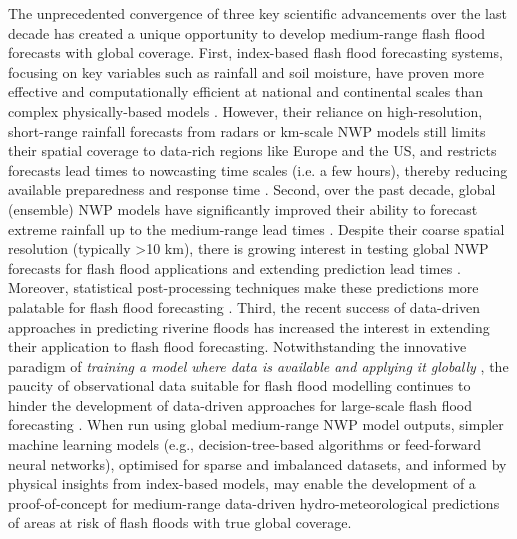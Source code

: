 The  unprecedented convergence of three key scientific advancements over the last decade has created a unique opportunity to develop medium-range flash flood forecasts with global coverage. First, index-based flash flood forecasting systems, focusing on key variables such as rainfall and soil moisture, have proven more effective and computationally efficient at national and continental scales than complex physically-based models \citep{Alfieri_2015a}. However, their reliance on high-resolution, short-range rainfall forecasts from radars or km-scale NWP models still limits their spatial coverage to data-rich regions like Europe and the US, and restricts forecasts lead times to nowcasting time scales (i.e. a few hours), thereby reducing available preparedness and response time \citep{Luong_2021, Maybee_2024}. Second, over the past decade, global (ensemble) NWP models have significantly improved their ability to forecast extreme rainfall up to the medium-range lead times \citep{Lavers_2021, Haiden_2023}. Despite their coarse spatial resolution (typically >10 km), there is growing interest in testing global NWP forecasts for flash flood applications and extending prediction lead times \citep{Bucherie_2022b}. Moreover, statistical post-processing techniques make these predictions more palatable for flash flood forecasting \citep{Vannitsem_2021}. Third, the recent success of data-driven approaches in predicting riverine floods \citep{Nearing_2024} has increased the interest in extending their application to flash flood forecasting. Notwithstanding the innovative paradigm of \textit{training a model where data is available and applying it globally} \citep{Kratzert_2024}, the paucity of observational data suitable for flash flood modelling continues to hinder the development of data-driven approaches for large-scale flash flood forecasting \citep{Alzubaidi_2023}. When run using global medium-range NWP model outputs, simpler machine learning models (e.g., decision-tree-based algorithms or feed-forward neural networks), optimised for sparse and imbalanced datasets, and informed by physical insights from index-based models, may enable the development of a proof-of-concept for medium-range data-driven hydro-meteorological predictions of areas at risk of flash floods with true global coverage.


